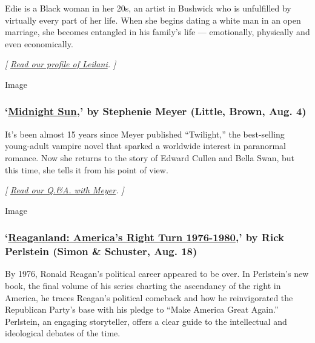 Edie is a Black woman in her 20s, an artist in Bushwick who is
unfulfilled by virtually every part of her life. When she begins dating
a white man in an open marriage, she becomes entangled in his family's
life --- emotionally, physically and even economically.

\emph{{[}}
\href{https://www.nytimes.com/2020/07/31/books/raven-leilani-luster.html}{\emph{Read
our profile of Leilani}}\emph{. {]}}

Image

\hypertarget{midnight-sun-by-stephenie-meyer-little-brown-aug-4}{%
\subsubsection{\texorpdfstring{`\href{https://www.hachettebookgroup.com/titles/stephenie-meyer/midnight-sun/9780316592253/}{Midnight
Sun},' by Stephenie Meyer (Little, Brown, Aug.
4)}{`Midnight Sun,' by Stephenie Meyer (Little, Brown, Aug. 4)}}\label{midnight-sun-by-stephenie-meyer-little-brown-aug-4}}

It's been almost 15 years since Meyer published ``Twilight,'' the
best-selling young-adult vampire novel that sparked a worldwide interest
in paranormal romance. Now she returns to the story of Edward Cullen and
Bella Swan, but this time, she tells it from his point of view.

\emph{{[}}
\href{https://www.nytimes.com/2020/08/03/books/midnight-sun-stephenie-meyer-twilight.html}{\emph{Read
our Q.\&A. with Meyer}}\emph{. {]}}

Image

\hypertarget{reaganland-americas-right-turn-1976-1980-by-rick-perlstein-simon--schuster-aug-18}{%
\subsubsection{\texorpdfstring{`\href{https://www.simonandschuster.com/books/Reaganland/Rick-Perlstein/9781476793054}{Reaganland:
America's Right Turn 1976-1980},' by Rick Perlstein (Simon \& Schuster,
Aug.
18)}{`Reaganland: America's Right Turn 1976-1980,' by Rick Perlstein (Simon \& Schuster, Aug. 18)}}\label{reaganland-americas-right-turn-1976-1980-by-rick-perlstein-simon--schuster-aug-18}}

By 1976, Ronald Reagan's political career appeared to be over. In
Perlstein's new book, the final volume of his series charting the
ascendancy of the right in America, he traces Reagan's political
comeback and how he reinvigorated the Republican Party's base with his
pledge to ``Make America Great Again.'' Perlstein, an engaging
storyteller, offers a clear guide to the intellectual and ideological
debates of the time.

